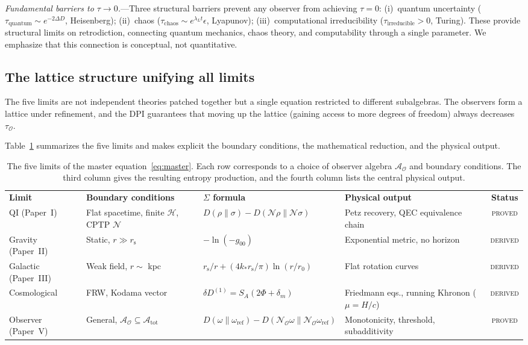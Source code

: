 \documentclass[prd,twocolumn,superscriptaddress,longbibliography,floatfix]{revtex4-2}
\newcommand{\chan}{\mathcal{N}}
\newcommand{\hilb}{\mathcal{H}}
\newcommand{\KL}{D}
\newcommand{\tauasym}{\tau}
\newcommand{\rs}{r_{\mathrm{s}}}
\newcommand{\Aobs}{\mathcal{A}_{\mathcal{O}}}
\newcommand{\Atot}{\mathcal{A}_{\mathrm{tot}}}
\newcommand{\tauO}{\tauasym_{\mathcal{O}}}
\begin{document}
\emph{Fundamental barriers to $\tauasym \to 0$.}---Three
structural barriers prevent any observer from achieving
$\tauasym = 0$:
(i)~quantum uncertainty ($\tauasym_{\mathrm{quantum}}
\sim e^{-2\Delta D}$, Heisenberg);
(ii)~chaos ($\tauasym_{\mathrm{chaos}} \sim
e^{\lambda_L t}\epsilon$, Lyapunov);
(iii)~computational irreducibility
($\tauasym_{\mathrm{irreducible}} > 0$, Turing).
These provide structural limits on retrodiction,
connecting quantum mechanics, chaos theory, and
computability through a single parameter.  We
emphasize that this connection is conceptual,
not quantitative.


\subsection{The lattice structure unifying all limits}
\label{sec:lattice_unification}

The five limits are not independent theories patched
together but a single equation restricted to different
subalgebras.  The observers form a lattice under
refinement, and the DPI guarantees that moving up the
lattice (gaining access to more degrees of freedom)
always decreases $\tauO$.

Table~\ref{tab:limits} summarizes the five limits
and makes explicit the boundary conditions, the
mathematical reduction, and the physical
output.

\begin{table}[t]
\caption{\label{tab:limits}The five limits of
the master equation~\eqref{eq:master}.  Each
row corresponds to a choice of observer algebra
$\Aobs$ and boundary conditions.  The third column
gives the resulting entropy production, and the
fourth column lists the central physical output.}
\begin{ruledtabular}
\begin{tabular}{llllc}
\textbf{Limit} &
\textbf{Boundary conditions} &
\textbf{$\Sigma$ formula} &
\textbf{Physical output} &
\textbf{Status} \\
\colrule
QI (Paper~I) &
Flat spacetime, finite $\hilb$, CPTP $\chan$ &
$\KL(\rho\|\sigma) - \KL(\chan\rho\|\chan\sigma)$ &
Petz recovery, QEC equivalence chain &
\textsc{proved} \\
Gravity (Paper~II) &
Static, $r \gg \rs$ &
$-\ln(-g_{00})$ &
Exponential metric, no horizon &
\textsc{derived} \\
Galactic (Paper~III) &
Weak field, $r \sim$ kpc &
$\rs/r + (4k_*\rs/\pi)\ln(r/r_0)$ &
Flat rotation curves &
\textsc{derived} \\
Cosmological &
FRW, Kodama vector &
$\delta D^{(1)} = S_A(2\Phi + \delta_m)$ &
Friedmann eqs., running Khronon ($\mu = H/c$) &
\textsc{derived} \\
Observer (Paper~V) &
General, $\Aobs \subseteq \Atot$ &
$\KL(\omega\|\omega_{\mathrm{ref}}) -
\KL(\chan_{\!\mathcal{O}}\omega\|
\chan_{\!\mathcal{O}}\omega_{\mathrm{ref}})$ &
Monotonicity, threshold, subadditivity &
\textsc{proved} \\
\end{tabular}
\end{ruledtabular}
\end{table}
\end{document}
